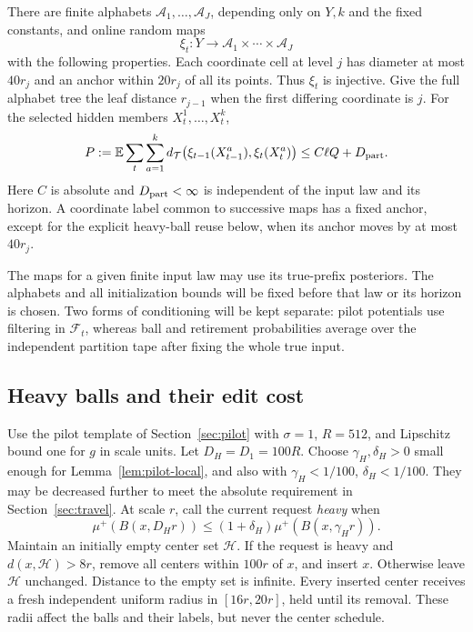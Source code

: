 \begin{proposition}\label{prop:embedded-cost}
There are finite alphabets \(\mathcal A_1,\ldots,\mathcal A_J\), depending
only on \(Y,k\) and the fixed constants, and online random maps
\[
 \xi_t:Y\longrightarrow\mathcal A_1\times\cdots\times\mathcal A_J
\]
with the following properties.  Each coordinate cell at level \(j\) has
diameter at most \(40r_j\) and an anchor within \(20r_j\) of all its points.
Thus \(\xi_t\) is injective.  Give the full alphabet tree the leaf distance
\(r_{j-1}\) when the first differing coordinate is \(j\).  For the selected
hidden members \(X_t^1,\ldots,X_t^k\),
\begin{equation}\label{eq:embedded-cost}
 P:=\mathbb E\sum_t\sum_{a=1}^k
 d_{\mathcal T}\bigl(\xi_{t-1}(X_{t-1}^a),\xi_t(X_t^a)\bigr)
 \le C\ell Q+D_{\rm part}.
\end{equation}
Here \(C\) is absolute and \(D_{\rm part}<\infty\) is independent of the
input law and its horizon.  A coordinate label common to successive maps
has a fixed anchor, except for the explicit heavy-ball reuse below, when
its anchor moves by at most \(40r_j\).
\end{proposition}

The maps for a given finite input law may use its true-prefix posteriors.
The alphabets and all initialization bounds will be fixed before that law
or its horizon is chosen.  Two forms of conditioning will be kept separate:
pilot potentials use filtering in \(\mathcal F_t\), whereas ball and
retirement probabilities average over the independent partition tape after
fixing the whole true input.

\subsection{Heavy balls and their edit cost}

Use the pilot template of Section~\ref{sec:pilot} with
\(\sigma=1\), \(R=512\), and Lipschitz bound one for \(g\) in scale units.
Let \(D_H=D_1=100R\).  Choose \(\gamma_H,\delta_H>0\) small enough for
Lemma~\ref{lem:pilot-local}, and also with
\(\gamma_H<1/100\), \(\delta_H<1/100\).  They may be decreased further
to meet the absolute requirement in Section~\ref{sec:travel}.
At scale \(r\), call the current request \emph{heavy} when
\begin{equation}\label{eq:heavy-condition}
 \mu^+(B(x,D_Hr))
 \le(1+\delta_H)\mu^+(B(x,\gamma_Hr)).
\end{equation}
Maintain an initially empty center set \(\mathcal H\).  If the request is
heavy and \(d(x,\mathcal H)>8r\), remove all centers within \(100r\) of
\(x\), and insert \(x\).  Otherwise leave \(\mathcal H\) unchanged.
Distance to the empty set is infinite.  Every inserted center receives a
fresh independent uniform radius in \([16r,20r]\), held until its removal.
These radii affect the balls and their labels, but never the center schedule.

